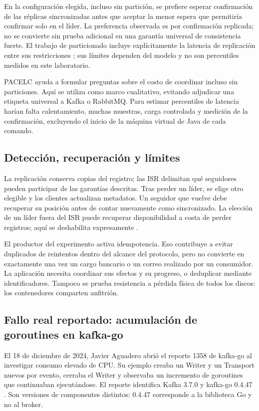 \documentclass[11pt,a4paper]{article}
\begin{document}
En la configuración elegida, incluso sin partición, se prefiere esperar confirmación de las réplicas sincronizadas antes que aceptar la menor espera que permitiría confirmar solo en el líder. La preferencia observada es por confirmación replicada; no se convierte sin prueba adicional en una garantía universal de consistencia fuerte. El trabajo de particionado incluye explícitamente la latencia de replicación entre sus restricciones \cite{raptis2024partitioning}; sus límites dependen del modelo y no son percentiles medidos en este laboratorio.

PACELC ayuda a formular preguntas sobre el costo de coordinar incluso sin particiones. Aquí se utiliza como marco cualitativo, evitando adjudicar una etiqueta universal a Kafka o RabbitMQ. Para estimar percentiles de latencia harían falta calentamiento, muchas muestras, carga controlada y medición de la confirmación, excluyendo el inicio de la máquina virtual de Java de cada comando.

\subsection{Detección, recuperación y límites}
La replicación conserva copias del registro; las ISR delimitan qué seguidores pueden participar de las garantías descritas. Tras perder un líder, se elige otro elegible y los clientes actualizan metadatos. Un seguidor que vuelve debe recuperar su posición antes de contar nuevamente como sincronizado. La elección de un líder fuera del ISR puede recuperar disponibilidad a costa de perder registros; aquí se deshabilita expresamente \cite{kafka391design}.

El productor del experimento activa idempotencia. Eso contribuye a evitar duplicados de reintentos dentro del alcance del protocolo, pero no convierte en exactamente una vez un cargo bancario o un correo realizado por un consumidor. La aplicación necesita coordinar sus efectos y su progreso, o deduplicar mediante identificadores. Tampoco se prueba resistencia a pérdida física de todos los discos: los contenedores comparten anfitrión.
\subsection{Fallo real reportado: acumulación de goroutines en kafka-go}
El 18 de diciembre de 2024, Javier Aguadero abrió el reporte 1358 de kafka-go al investigar consumo elevado de CPU. Su ejemplo creaba un Writer y un Transport nuevos por evento, cerraba el Writer y observaba un incremento de goroutines que continuaban ejecutándose. El reporte identifica Kafka 3.7.0 y kafka-go 0.4.47 \cite{aguadero2024goroutines}. Son versiones de componentes distintos: 0.4.47 corresponde a la biblioteca Go y no al broker.
\end{document}
